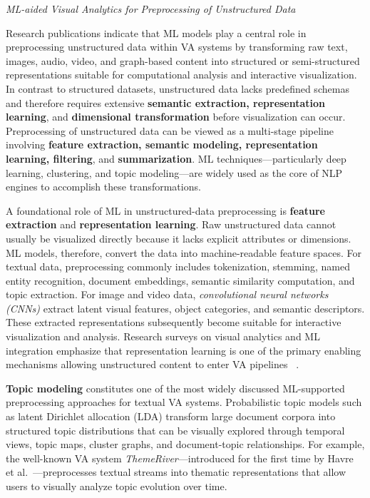 \documentclass{sfuthesis}
\begin{document}
\noindent\textit{ML-aided Visual Analytics for Preprocessing of Unstructured Data}\par
Research publications indicate that ML models play a central role in preprocessing unstructured data within VA systems by transforming raw text, images, audio, video, and graph-based content into structured or semi-structured representations suitable for computational analysis and interactive visualization. In contrast to structured datasets, unstructured data lacks predefined schemas and therefore requires extensive \textbf{semantic extraction, representation learning}, and \textbf{dimensional transformation} before visualization can occur. Preprocessing of unstructured data can be viewed as a multi-stage pipeline involving \textbf{feature extraction, semantic modeling, representation learning, filtering}, and \textbf{summarization}. ML techniques—particularly deep learning, clustering, and topic modeling—are widely used as the core of NLP engines to accomplish these transformations.\par
A foundational role of ML in unstructured-data preprocessing is \textbf{feature extraction} and \textbf{representation learning}. Raw unstructured data cannot usually be visualized directly because it lacks explicit attributes or dimensions. ML models, therefore, convert the data into machine-readable feature spaces. For textual data, preprocessing commonly includes tokenization, stemming, named entity recognition, document embeddings, semantic similarity computation, and topic extraction. For image and video data, \textit{convolutional neural networks (CNNs)} extract latent visual features, object categories, and semantic descriptors. These extracted representations subsequently become suitable for interactive visualization and analysis. Research surveys on visual analytics and ML integration emphasize that representation learning is one of the primary enabling mechanisms allowing unstructured content to enter VA pipelines ~\cite{yuan2021survey}.\par
\textbf{Topic modeling} constitutes one of the most widely discussed ML-supported preprocessing approaches for textual VA systems. Probabilistic topic models such as latent Dirichlet allocation (LDA) transform large document corpora into structured topic distributions that can be visually explored through temporal views, topic maps, cluster graphs, and document-topic relationships. For example, the well-known VA system \textit{ThemeRiver}—introduced for the first time by Havre et al.~\cite{havre2002themeriver}—preprocesses textual streams into thematic representations that allow users to visually analyze topic evolution over time.\par
\end{document}
